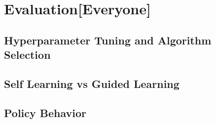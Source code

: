 \section{Evaluation[Everyone]}\label{sec:eval}


\subsection{Hyperparameter Tuning and Algorithm Selection}

\subsection{Self Learning vs Guided Learning}

\subsection{Policy Behavior}
